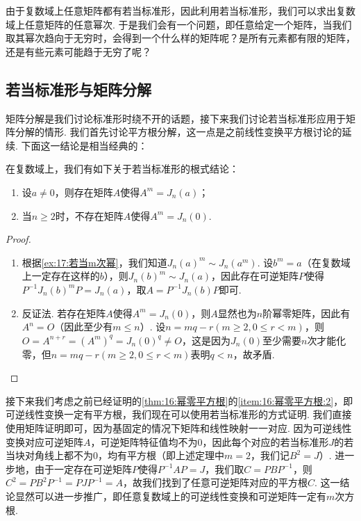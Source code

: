 由于复数域上任意矩阵都有若当标准形，因此利用若当标准形，我们可以求出复数域上任意矩阵的任意幂次. 于是我们会有一个问题，即任意给定一个矩阵，当我们取其幂次趋向于无穷时，会得到一个什么样的矩阵呢？是所有元素都有限的矩阵，还是有些元素可能趋于无穷了呢？

\subsection{若当标准形与矩阵分解}
矩阵分解是我们讨论标准形时绕不开的话题，接下来我们讨论若当标准形应用于矩阵分解的情形. 我们首先讨论平方根分解，这一点是之前线性变换平方根讨论的延续. 下面这一结论是相当经典的：
\begin{theorem} \label{thm:17:若当标准形m次根}
    在复数域上，我们有如下关于若当标准形的根式结论：
    \begin{enumerate}
        \item 设$a\neq 0$，则存在矩阵$A$使得$A^m=J_n(a)$；
        \item 当$n\geqslant 2$时，不存在矩阵$A$使得$A^m=J_n(0)$.
    \end{enumerate}
\end{theorem}

\begin{proof}
    \begin{enumerate}
        \item 根据\autoref{ex:17:若当m次幂}，我们知道$J_n(a)^m\sim J_n(a^m)$. 设$b^m=a$（在复数域上一定存在这样的$b$），则$J_n(b)^m\sim J_n(a)$，因此存在可逆矩阵$P$使得$P^{-1}J_n(b)^mP=J_n(a)$，取$A=P^{-1}J_n(b)P$即可.

        \item 反证法. 若存在矩阵$A$使得$A^m=J_n(0)$，则$A$显然也为$n$阶幂零矩阵，因此有$A^n=O$（因此至少有$m\leqslant n$）. 设$n=mq-r(m\geqslant 2,0\leqslant r<m)$，则$O=A^{n+r}=(A^m)^q=J_n(0)^q\neq O$，这是因为$J_n(0)$至少需要$n$次才能化零，但$n=mq-r(m\geqslant 2,0\leqslant r<m)$表明$q<n$，故矛盾.
    \end{enumerate}
\end{proof}

接下来我们考虑之前已经证明的\autoref{thm:16:幂零平方根}的\ref*{item:16:幂零平方根:2}，即可逆线性变换一定有平方根，我们现在可以使用若当标准形的方式证明. 我们直接使用矩阵证明即可，因为基固定的情况下矩阵和线性映射一一对应. 因为可逆线性变换对应可逆矩阵$A$，可逆矩阵特征值均不为0，因此每个对应的若当标准形$J$的若当块对角线上都不为0，均有平方根（即上述定理中$m=2$，我们记$B^2=J$）. 进一步地，由于一定存在可逆矩阵$P$使得$P^{-1}AP=J$，我们取$C=PBP^{-1}$，则$C^2=PB^2P^{-1}=PJP^{-1}=A$，故我们找到了任意可逆矩阵对应的平方根$C$. 这一结论显然可以进一步推广，即任意复数域上的可逆线性变换和可逆矩阵一定有$m$次方根.

